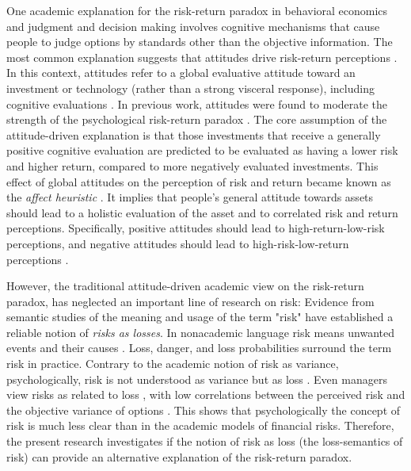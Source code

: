 \documentclass[a4paper,man, natbib,floatsintext]{apa6} %
\begin{document}
One academic explanation for the risk-return paradox in behavioral economics and judgment and decision making involves cognitive mechanisms that cause people to judge options by standards other than the objective information. The most common explanation suggests that attitudes drive risk-return perceptions \citep[some work indicates an influence of representativeness on risk perceptions,][but most work focuses on attitudes]{Shefrin1995, Shefrin2001, Pachur2012b}. In this context, attitudes refer to a global evaluative attitude toward an investment or technology (rather than a strong visceral response), including cognitive evaluations \citep[a global "good and bad"; ][]{Ganzach2000, Sjoerberg2007,Sokolowska2015}. In previous work, attitudes were found to moderate the strength of the psychological risk-return paradox \citep{Ganzach2000, Kempf2014, Finucane2000, Slovic2004}. The core assumption of the attitude-driven explanation is that those investments that receive a generally positive cognitive evaluation are predicted to be evaluated as having a lower risk and higher return, compared to more negatively evaluated investments. This effect of global attitudes on the perception of risk and return became known as the \textit{affect heuristic}  \citep{Finucane2000,Slovic2004}. It implies that people's general attitude towards assets should lead to a holistic evaluation of the asset and to correlated risk and return perceptions. Specifically, positive attitudes should lead to high-return-low-risk perceptions, and negative attitudes should lead to high-risk-low-return perceptions \citep{Ganzach2000, Finucane2000}.

However, the traditional attitude-driven academic view on the risk-return paradox, has neglected an important line of  research on risk: Evidence from semantic studies of the meaning and usage of the term "risk" have established a reliable notion of \textit{risks as losses}. In nonacademic language risk means unwanted events and their causes \citep[American English corpus from 1992-2012,][]{Boholm2016}. Loss, danger, and loss probabilities surround the term risk in practice. Contrary to the academic notion of risk as variance,  psychologically, risk is not understood as variance but as loss \citep[e.g.][]{Libby1977, Sachse2012}. Even managers view risks as related to loss \citep{Mohr2010, Duxbury2004, Shapira1995}, with low correlations between the perceived risk and the objective variance of options \citep{Weber2005,Klos2005a}. This shows that psychologically the concept of risk is much less clear than in the academic models of financial risks. Therefore, the present research investigates if the notion of risk as loss (the loss-semantics of risk) can provide an alternative explanation of the risk-return paradox.
\end{document}

